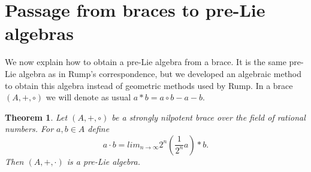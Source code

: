 \documentclass[12pt]{article}
\newtheorem{theorem}{Theorem}
\begin{document}
$ $


\section{Passage from braces to pre-Lie algebras}\label{4}



 We now explain how to obtain a pre-Lie algebra from a brace.  It is the same pre-Lie algebra as in Rump's correspondence,  but we developed an algebraic method to obtain this algebra  instead of geometric methods used by Rump.
 In a brace $(A, +, \circ)$ we will denote as usual  $a*b=a\circ b-a-b$.



\begin{theorem}\label{main}
 Let $(A, +, \circ )$ be a  strongly  nilpotent  brace over the field of rational numbers.  
For $a,b\in A$ define \[a\cdot b=lim _{n\rightarrow \infty }2^{n}({\frac 1{2^{n}}} a)*b.\]
 Then $(A, +, \cdot )$ is a pre-Lie algebra. 
\end{theorem}
\end{document}
